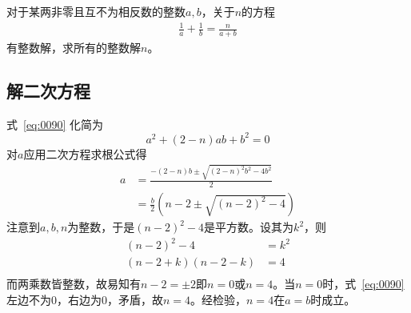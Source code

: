 

对于某两非零且互不为相反数的整数$a, b$，关于$n$的方程
\begin{align}
  \frac1a + \frac1b = \frac n{a + b} \label{eq:0090}
\end{align}
有整数解，求所有的整数解$n$。


\subsection{解二次方程}

式~\ref{eq:0090} 化简为
\[ a^2 + (2 - n)ab + b^2 = 0 \]
对$a$应用二次方程求根公式得
\begin{align*}
  a &= \frac{-(2 - n)b \pm \sqrt{(2 - n)^2b^2 - 4b^2}}2 \\
  &= \frac b2\left(n - 2 \pm \sqrt{(n - 2)^2 - 4}\right)
\end{align*}
注意到$a, b, n$为整数，于是$(n - 2)^2 - 4$是平方数。设其为$k^2$，则
\begin{align*}
  (n - 2)^2 - 4 &= k^2 \\
  (n - 2 + k)(n - 2 - k) &= 4 \\
\end{align*}
而两乘数皆整数，故易知有$n - 2 = \pm2$即$n = 0$或$n = 4$。当$n = 0$时，式~\ref{eq:0090} 左边不为0，右边为0，矛盾，故$n = 4$。经检验，$n = 4$在$a = b$时成立。
